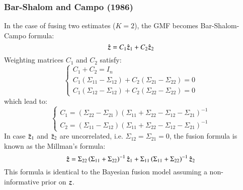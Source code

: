 \subsubsection*{Bar-Shalom and Campo (1986)}
In the case of fusing two estimates ($ K=2 $), the GMF becomes Bar-Shalom-Campo formula:
\begin{equation}
\hat{\operatorname{\boldsymbol{z}}}=C_1\hat{\operatorname{\boldsymbol{z}}}_1+C_2\hat{\operatorname{\boldsymbol{z}}}_2
\end{equation}
Weighting matrices $ C_1 $ and $ C_2 $ satisfy:
\begin{equation}
\begin{cases}
C_1+C_2=I_n\\
C_1\left(\Sigma_{11}-\Sigma_{12}\right)+C_2\left(\Sigma_{21}-\Sigma_{22}\right)=0 \\
C_1\left(\Sigma_{12}-\Sigma_{12}\right)+C_2\left(\Sigma_{22}-\Sigma_{22}\right)=0
\end{cases}
\end{equation}
which lead to:
\begin{equation}
\begin{cases}
C_1 = \left(\Sigma_{22}-\Sigma_{21}\right)\left(\Sigma_{11}+\Sigma_{22}-\Sigma_{12}-\Sigma_{21}\right)^{-1}\\
C_2 = \left(\Sigma_{11}-\Sigma_{12}\right)\left(\Sigma_{11}+\Sigma_{22}-\Sigma_{12}-\Sigma_{21}\right)^{-1}
\end{cases}
\end{equation}
In case $ \tilde{\operatorname{\boldsymbol{z}}}_1 $ and $ \tilde{\operatorname{\boldsymbol{z}}}_2 $ are uncorrelated, i.e. $ \Sigma_{12}=\Sigma_{21}=0 $, the fusion formula is known as the Millman's formula:
\begin{equation}
\hat{\operatorname{\boldsymbol{z}}}=\Sigma_{22}\left(\Sigma_{11}+\Sigma_{22}\right)^{-1}\hat{\operatorname{\boldsymbol{z}}}_1+\Sigma_{11}\left(\Sigma_{11}+\Sigma_{22}\right)^{-1}\hat{\operatorname{\boldsymbol{z}}}_2
\end{equation}
This formula is identical to the Bayesian fusion model assuming a non-informative prior on $ \operatorname{\boldsymbol{z}} $.
